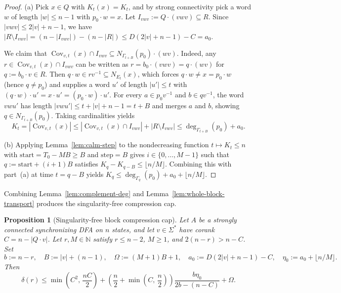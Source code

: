 \documentclass[11pt]{article}
\newtheorem{proposition}[theorem]{Proposition}
\theoremstyle{definition}
\theoremstyle{remark}
\newcommand{\Cov}{\operatorname{Cov}}
\newcommand{\N}{\mathbb{N}}
\begin{document}
\begin{proof}
(a) Pick $x \in Q$ with $K_t(x) = K_t$, and by strong connectivity pick a word $w$ of length $|w| \le n - 1$ with $p_0 \cdot w = x$. Let $I_{vwv} := Q \cdot (vwv) \subseteq R$. Since $|vwv| \le 2|v| + n - 1$, we have $|R \setminus I_{vwv}| = (n - |I_{vwv}|) - (n - |R|) \le D(2|v| + n - 1) - C = a_0$.

We claim that $\Cov_{v, t}(x) \cap I_{vwv} \subseteq N_{\Gamma_{t+B}}(p_0) \cdot (wv)$. Indeed, any $r \in \Cov_{v, t}(x) \cap I_{vwv}$ can be written as $r = b_0 \cdot (vwv) = q \cdot (wv)$ for $q := b_0 \cdot v \in R$. Then $q \cdot w \in r v^{-1} \subseteq N_{E_t}(x)$, which forces $q \cdot w \ne x = p_0 \cdot w$ (hence $q \ne p_0$) and supplies a word $u'$ of length $|u'| \le t$ with $(q \cdot w) \cdot u' = x \cdot u' = (p_0 \cdot w) \cdot u'$. For every $a \in p_0 v^{-1}$ and $b \in q v^{-1}$, the word $vwu'$ has length $|vwu'| \le t + |v| + n - 1 = t + B$ and merges $a$ and $b$, showing $q \in N_{\Gamma_{t+B}}(p_0)$. Taking cardinalities yields
\[
  K_t = |\Cov_{v, t}(x)| \le |\Cov_{v, t}(x) \cap I_{vwv}| + |R \setminus I_{vwv}| \le \deg_{\Gamma_{t+B}}(p_0) + a_0.
\]

(b) Applying Lemma~\ref{lem:calm-step} to the nondecreasing function $t \mapsto K_t \le n$ with $\mathrm{start} = T_0 - M B \ge B$ and $\mathrm{step} = B$ gives $i \in \{0, \dots, M - 1\}$ such that $q := \mathrm{start} + (i + 1) B$ satisfies $K_q - K_{q - B} \le \lfloor n / M \rfloor$. Combining this with part~(a) at time $t = q - B$ yields $K_q \le \deg_{\Gamma_q}(p_0) + a_0 + \lfloor n / M \rfloor$.
\end{proof}

Combining Lemma~\ref{lem:complement-deg} and Lemma~\ref{lem:whole-block-transport} produces the singularity-free compression cap.

\begin{proposition}[Singularity-free block compression cap]\label{prop:singularity-free-cap}
Let $A$ be a strongly connected synchronizing DFA on $n$ states, and let $v \in \Sigma^*$ have corank $C = n - |Q \cdot v|$. Let $r, M \in \N$ satisfy $r \le n - 2$, $M \ge 1$, and $2(n - r) > n - C$. Set
\[
  b := n - r, \quad B := |v| + (n - 1), \quad \Omega := (M + 1) B + 1, \quad
  a_0 := D(2|v| + n - 1) - C, \quad \eta_0 := a_0 + \lfloor n / M \rfloor.
\]
Then
\begin{equation}\label{eq:sf-cap}
  \delta(r) \le \min\!\left(C^2,\, \frac{n C}{2}\right)
    + \left(\frac{n}{2} + \min\!\left(C,\, \frac{n}{2}\right)\right)
      \frac{b \eta_0}{2b - (n - C)}
    + \Omega.
\end{equation}
\end{proposition}
\end{document}

